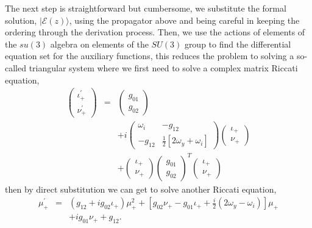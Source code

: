 \documentclass[9pt,twocolumn,twoside]{osajnl}
\begin{document}
The next step is straightforward but cumbersome, we substitute the formal solution, $\vert \mathcal{E}(z) \rangle$, using the propagator above and being careful in keeping the ordering through the derivation process. 
Then, we use the actions of elements of the $su(3)$ algebra on elements of the $SU(3)$ group \cite{Nelson1967p857} to find the differential equation set for the auxiliary functions, this reduces the problem to solving a so-called triangular system where we first need to solve a complex matrix Riccati equation,
\begin{eqnarray}\label{eq:fstRiccati}
\left( \begin{array}{c} \iota_{+}^{\prime} \\ \nonumber
\nu_{+}^{\prime}  \end{array}\right) &=& 
\left(\begin{array}
	{c} g_{01} \\ 
	g_{02}  
\end{array}\right) \\\nonumber
&&+ i 
\left(\begin{array}{cc}  
 	\omega_{i} & - g_{12} \\
 	- g_{12} & \frac{1}{2} 
 	\left[ 2\omega_{y} +
 	 \omega_{i}\right]
\end{array}\right)
\left( \begin{array}{c} 
 	\iota_{+} 
 	\\ \nu_{+}
\end{array}\right)
\\
&&+ \left( \begin{array}{c} 
\iota_{+} 
\\ \nu_{+}
\end{array}\right)
\left(\begin{array}{c}  
g_{01} \\
g_{02}
\end{array}\right)^T
\left( \begin{array}{c} 
\iota_{+} 
\\ \nu_{+}
\end{array}\right)
\end{eqnarray}
then by direct substitution we can get to solve another Riccati equation,
\begin{eqnarray}\label{eq:sndRiccati}
\mu_{+}^{\prime} &=& \left(g_{12} + i g_{02} \iota_{+} \right)\mu_{+}^{2} + \left[ g_{02} \nu_{+} - g_{01} \iota_{+} + \frac{i}{2} \left(2\omega_{y} - \omega_{i} \right)\right] \mu_{+} \nonumber \\ && + i g_{01} \nu_{+} + g_{12}.
\end{eqnarray}
\end{document}
